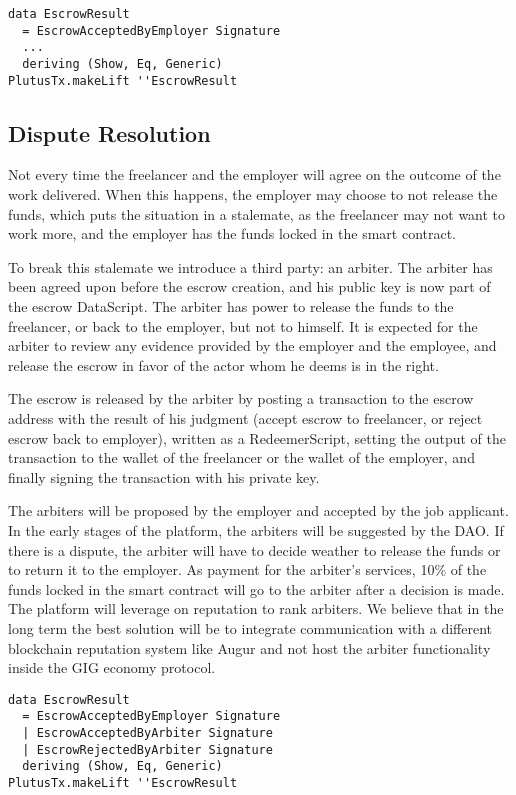 \documentclass{article}
\begin{document}
\begin{samepage}
\begin{verbatim}
data EscrowResult
  = EscrowAcceptedByEmployer Signature
  ...
  deriving (Show, Eq, Generic)
PlutusTx.makeLift ''EscrowResult
\end{verbatim}
\end{samepage}


\subsection{Dispute Resolution}
Not every time the freelancer and the employer will agree on the outcome of the work delivered. When this happens, the employer may choose to not release the funds, which puts the situation in a stalemate, as the freelancer may not want to work more, and the employer has the funds locked in the smart contract.

To break this stalemate we introduce a third party: an arbiter. The arbiter has been agreed upon before the escrow creation, and his public key is now part of the escrow DataScript. The arbiter has power to release the funds to the freelancer, or back to the employer, but not to himself. It is expected for the arbiter to review any evidence provided by the employer and the employee, and release the escrow in favor of the actor whom he deems is in the right.

The escrow is released by the arbiter by posting a transaction to the escrow address with the result of his judgment (accept escrow to freelancer, or reject escrow back to employer), written as a RedeemerScript, setting the output of the transaction to the wallet of the freelancer or the wallet of the employer, and finally signing the transaction with his private key.

The arbiters will be proposed by the employer and accepted by the job applicant. In the early stages of the platform, the arbiters will be suggested by the DAO. If there is a dispute, the arbiter will have to decide weather to release the funds or to return it to the employer. As payment for the arbiter's services,  10\% of the funds locked in the smart contract will go to the arbiter after a decision is made. The platform will leverage on reputation to rank arbiters. We believe that in the long term the best solution will be to integrate communication with a different blockchain reputation system like Augur and not host the arbiter functionality inside the GIG economy protocol.

\begin{samepage}
\begin{verbatim}
data EscrowResult
  = EscrowAcceptedByEmployer Signature
  | EscrowAcceptedByArbiter Signature
  | EscrowRejectedByArbiter Signature
  deriving (Show, Eq, Generic)
PlutusTx.makeLift ''EscrowResult
\end{verbatim}
\end{samepage}
\end{document}
